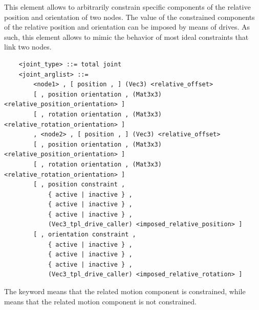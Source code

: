 This element allows to arbitrarily constrain specific components
of the relative position and orientation of two nodes.
The value of the constrained components of the relative position
and orientation can be imposed by means of drives.
As such, this element allows to mimic the behavior of most
ideal constraints that link two nodes.
\begin{verbatim}
    <joint_type> ::= total joint
    <joint_arglist> ::=
        <node1> , [ position , ] (Vec3) <relative_offset>
        [ , position orientation , (Mat3x3) <relative_position_orientation> ]
        [ , rotation orientation , (Mat3x3) <relative_rotation_orientation> ]
        , <node2> , [ position , ] (Vec3) <relative_offset>
        [ , position orientation , (Mat3x3) <relative_position_orientation> ]
        [ , rotation orientation , (Mat3x3) <relative_rotation_orientation> ]
        [ , position constraint ,
            { active | inactive } ,
            { active | inactive } ,
            { active | inactive } ,
            (Vec3_tpl_drive_caller) <imposed_relative_position> ]
        [ , orientation constraint ,
            { active | inactive } ,
            { active | inactive } ,
            { active | inactive } ,
            (Vec3_tpl_drive_caller) <imposed_relative_rotation> ]
\end{verbatim}
The keyword  means that the related motion component
is constrained, while  means that the related motion component
is not constrained.

